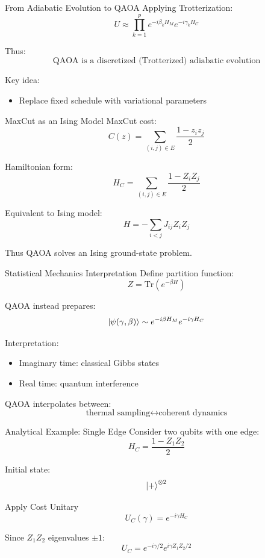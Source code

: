\documentclass{beamer}
\begin{document}
\begin{frame}{From Adiabatic Evolution to QAOA}
Applying Trotterization:
\[
U \approx \prod_{k=1}^p
e^{-i\beta_k H_M} e^{-i\gamma_k H_C}
\]

Thus:
\[
\boxed{\text{QAOA is a discretized (Trotterized) adiabatic evolution}}
\]

Key idea:
\begin{itemize}
\item Replace fixed schedule with variational parameters
\end{itemize}
\end{frame}

\begin{frame}{MaxCut as an Ising Model}
MaxCut cost:
\[
C(z) = \sum_{(i,j)\in E} \frac{1 - z_i z_j}{2}
\]

Hamiltonian form:
\[
H_C = \sum_{(i,j)\in E} \frac{1 - Z_i Z_j}{2}
\]

Equivalent to Ising model:
\[
H = -\sum_{i<j} J_{ij} Z_i Z_j
\]

Thus QAOA solves an Ising ground-state problem.
\end{frame}

\begin{frame}{Statistical Mechanics Interpretation}
Define partition function:
\[
Z = \mathrm{Tr}(e^{-\beta H})
\]

QAOA instead prepares:
\[
\ket{\psi(\gamma,\beta)} \sim e^{-i\beta H_M} e^{-i\gamma H_C}
\]

Interpretation:
\begin{itemize}
\item Imaginary time: classical Gibbs states
\item Real time: quantum interference
\end{itemize}

QAOA interpolates between:
\[
\text{thermal sampling} \leftrightarrow \text{coherent dynamics}
\]
\end{frame}

\begin{frame}{Analytical Example: Single Edge}
Consider two qubits with one edge:
\[
H_C = \frac{1 - Z_1 Z_2}{2}
\]

Initial state:
\[
\ket{+}^{\otimes 2}
\]
\end{frame}

\begin{frame}{Apply Cost Unitary}
\[
U_C(\gamma) = e^{-i\gamma H_C}
\]

Since $Z_1 Z_2$ eigenvalues $\pm1$:
\[
U_C = e^{-i\gamma/2} e^{i\gamma Z_1 Z_2 /2}
\]
\end{frame}
\end{document}
